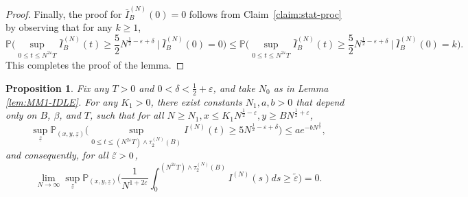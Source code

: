 \documentclass[11pt, reqno]{article}
\newtheorem{prop}[theorem]{Proposition}
\numberwithin{equation}{section}
\numberwithin{theorem}{section}
\begin{document}
\begin{proof}
\noindent
Finally, the proof for $\bar{I}^{(N)}_B(0)=0$ follows from Claim~\ref{claim:stat-proc} by observing that for any $k\geq 1$,
\begin{equation*}
    \mathbb{P}\big(\sup_{0\leq t\leq N^{2\varepsilon}T}\bar{I}^{(N)}_B(t)\geq \frac{5}{2} N^{\frac{1}{2}-\varepsilon+\delta}\ \big|\ \bar{I}^{(N)}_B(0)=0\big)\leq \mathbb{P}\big(\sup_{0\leq t\leq N^{2\varepsilon}T}\bar{I}^{(N)}_B(t)\geq \frac{5}{2} N^{\frac{1}{2}-\varepsilon+\delta}\ \big|\ \bar{I}^{(N)}_B(0)=k\big).
\end{equation*}
This completes the proof of the lemma.
\end{proof}


\begin{prop}\label{prop:IDLE-INTEGRAL}
Fix any $T>0$ and $0<\delta<\frac{1}{2}+\varepsilon$, and take $N_0$ as in Lemma \ref{lem:MM1-IDLE}.
For any $K_1>0$, there exist constants $N_1,a, b>0$ that depend only on $B$, $\beta$, and $T$, such that
for all $N\geq N_1, x\leq K_1N^{\frac{1}{2}-\varepsilon}, y\geq B N^{\frac{1}{2}+\varepsilon}$,
\begin{equation}\label{eq:idle-sup}
   \sup_{\underline{z}} \mathbb{P}_{(x, y, \underline{z})}\Big(\sup_{0\leq t\leq (N^{2\varepsilon}T)\wedge\tau^{(N)}_2(B)}I^{(N)}(t)\geq 5N^{\frac{1}{2}-\varepsilon+\delta}\Big)\leq ae^{-bN^{\frac{\delta}{2}}},
\end{equation}
and consequently, for all $ \Tilde{\varepsilon}>0$,
\begin{equation}\label{eq:idle-integral}
    \lim_{N\rightarrow\infty}
    \sup_{\underline{z}} \mathbb{P}_{(x, y, \underline{z})}\Big(\frac{1}{N^{1+2\varepsilon}}\int_0^{(N^{2\varepsilon}T)\wedge\tau^{(N)}_2(B)} I^{(N)}(s)ds\geq \tilde{\varepsilon}\Big)=0.
\end{equation}
\end{prop}
\end{document}
